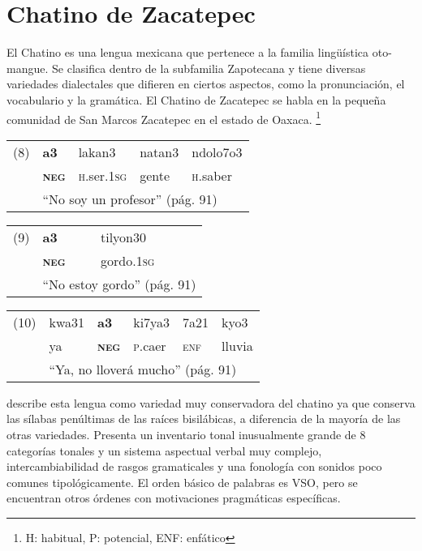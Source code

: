 \section*{Chatino de Zacatepec}

\noindent El Chatino es una lengua mexicana que pertenece a la familia lingüística oto-mangue. Se clasifica dentro de la subfamilia Zapotecana y tiene diversas variedades dialectales que difieren en ciertos aspectos, como la pronunciación, el vocabulario y la gramática. El Chatino de Zacatepec se habla en la pequeña comunidad de San Marcos Zacatepec en el estado de Oaxaca. \vspace{1cm} %
\footnote{H: habitual, P: potencial, ENF: enfático}

{\setmainfont{Charis SIL}

\begin{tabular}{lllll}
(8) & \textbf{a3} & lakan3 & natan3 & ndolo7o3 \\
& \textsc{\textbf{neg}} & \textsc{h}.ser.\textsc{1sg} & gente & \textsc{h}.saber \\
& \multicolumn{4}{l}{“No soy un profesor” (pág. 91)}
\end{tabular} \vspace{0.5cm}

\begin{tabular}{lll}
(9) & \textbf{a3} & tilyon30 \\
& \textsc{\textbf{neg}} & gordo.\textsc{1sg} \\
& \multicolumn{2}{l}{“No estoy gordo” (pág. 91)} \\
\end{tabular} \vspace{0.5cm}

\begin{tabular}{llllll}
(10) & kwa31 & \textbf{a3} & ki7ya3 & 7a21 & kyo3 \\
& ya & \textsc{\textbf{neg}} & \textsc{p}.caer & \textsc{enf} & lluvia \\
& \multicolumn{5}{l}{“Ya, no lloverá mucho” (pág. 91)}                
\end{tabular} \vspace{1cm}

} 

\textcolor{MidnightBlue}{\citet{chatino}} describe esta lengua como variedad muy conservadora del chatino ya que conserva las sílabas penúltimas de las raíces bisilábicas, a diferencia de la mayoría de las otras variedades. Presenta un inventario tonal inusualmente grande de 8 categorías tonales y un sistema aspectual verbal muy complejo, intercambiabilidad de rasgos gramaticales y una fonología con sonidos poco comunes tipológicamente. El orden básico de palabras es VSO, pero se encuentran otros órdenes con motivaciones pragmáticas específicas.

